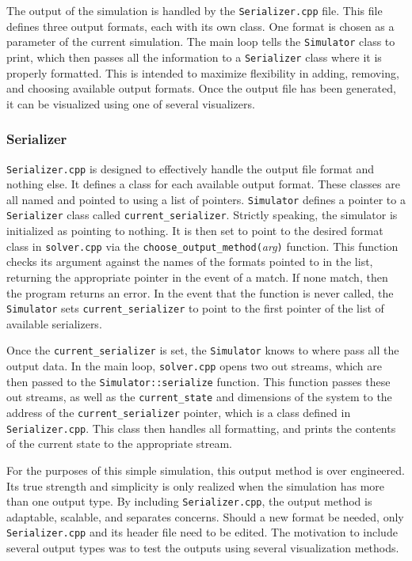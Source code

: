 \documentclass[a4paper,11pt]{article}
\begin{document}
The output of the simulation is handled by the \texttt{Serializer.cpp} file.  This file defines three output formats, each with its own class.  One format is chosen as a parameter of the current simulation.  The main loop tells the \texttt{Simulator} class to print, which then passes all the information to a \texttt{Serializer} class where it is properly formatted.   This is intended to maximize flexibility in adding, removing, and choosing available output formats.  Once the output file has been generated, it can be visualized using one of several visualizers.

\subsubsection{Serializer}

\texttt{Serializer.cpp} is designed to effectively handle the output file format and nothing else.  It defines a class for each available output format.  These classes are all named and pointed to using a list of pointers.  \texttt{Simulator} defines a pointer to a \texttt{Serializer} class called \texttt{current\_serializer}.  Strictly speaking, the simulator is initialized as pointing to nothing.  It is then set to point to the desired format class in \texttt{solver.cpp} via the \texttt{choose\_output\_method(}\emph{arg}\texttt{)} function.  This function checks its argument against the names of the formats pointed to in the list, returning the appropriate pointer in the event of a match.  If none match, then the program returns an error.  In the event that the function is never called, the \texttt{Simulator} sets \texttt{current\_serializer} to point to the first pointer of the list of available serializers.  

Once the  \texttt{current\_serializer} is set, the \texttt{Simulator} knows to where pass all the output data.  In the main loop, \texttt{solver.cpp}  opens two out streams, which are then passed to the \texttt{Simulator::serialize} function.  This function passes these out streams, as well as the \texttt{current\_state} and dimensions of the system to the address of the \texttt{current\_serializer} pointer, which is a class defined in \texttt{Serializer.cpp}.  This class then handles all formatting, and prints the contents of the current state to the appropriate stream.

For the purposes of this simple simulation, this output method is over engineered.  Its true strength and simplicity is only realized when the simulation has more than one output type.  By including \texttt{Serializer.cpp}, the output method is adaptable, scalable, and separates concerns.  Should a new format be needed, only \texttt{Serializer.cpp} and its header file need to be edited.  The motivation to include several output types was to test the outputs using several visualization methods.
\end{document}
